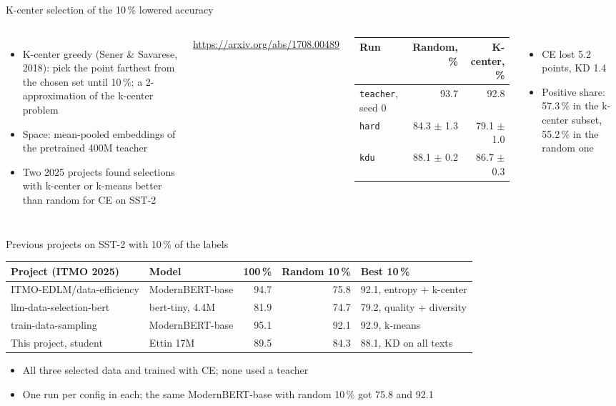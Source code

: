 \documentclass[aspectratio=169,11pt]{beamer}
\begin{document}
\begin{frame}{K-center selection of the 10\,\% lowered accuracy}
  \begin{columns}[T]
    \begin{itemize}
      \item K-center greedy (Sener \& Savarese, 2018): pick the point farthest from the chosen set until 10\,\%; a 2-approximation of the k-center problem
      \item Space: mean-pooled embeddings of the pretrained 400M teacher
      \item Two 2025 projects found selections with k-center or k-means better than random for CE on SST-2
    \end{itemize}
    \footnotesize \url{https://arxiv.org/abs/1708.00489}
    \small
    \begin{tabular}{lrr}
      \toprule
      Run & Random, \% & K-center, \% \\
      \midrule
      \texttt{teacher}, seed 0 & 93.7 & 92.8 \\
      \texttt{hard} & 84.3 $\pm$ 1.3 & 79.1 $\pm$ 1.0 \\
      \texttt{kdu} & 88.1 $\pm$ 0.2 & 86.7 $\pm$ 0.3 \\
      \bottomrule
    \end{tabular}

    \medskip
    \begin{itemize}
      \item CE lost 5.2 points, KD 1.4
      \item Positive share: 57.3\,\% in the k-center subset, 55.2\,\% in the random one
    \end{itemize}
  \end{columns}
\end{frame}

\begin{frame}{Previous projects on SST-2 with 10\,\% of the labels}
  \footnotesize
  \begin{tabular}{llrrl}
    \toprule
    Project (ITMO 2025) & Model & 100\,\% & Random 10\,\% & Best 10\,\% \\
    \midrule
    ITMO-EDLM/data-efficiency & ModernBERT-base & 94.7 & 75.8 & 92.1, entropy + k-center \\
    llm-data-selection-bert & bert-tiny, 4.4M & 81.9 & 74.7 & 79.2, quality + diversity \\
    train-data-sampling & ModernBERT-base & 95.1 & 92.1 & 92.9, k-means \\
    This project, student & Ettin 17M & 89.5 & 84.3 & 88.1, KD on all texts \\
    \bottomrule
  \end{tabular}

  \medskip
  \normalsize
  \begin{itemize}
    \item All three selected data and trained with CE; none used a teacher
    \item One run per config in each; the same ModernBERT-base with random 10\,\% got 75.8 and 92.1
  \end{itemize}
\end{frame}
\end{document}
